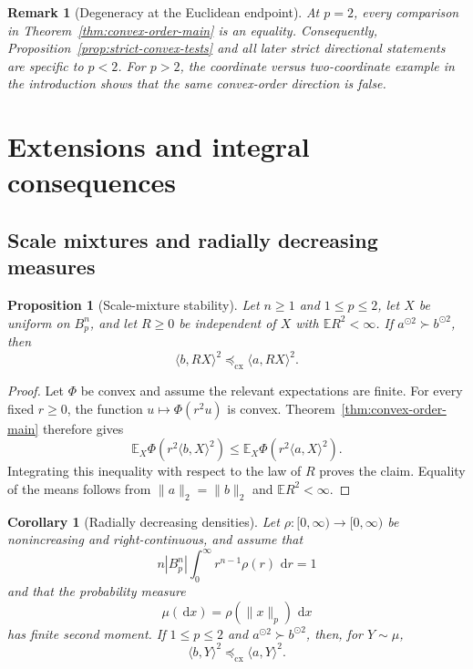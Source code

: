 \documentclass[pdflatex,sn-mathphys-num]{sn-jnl}
\numberwithin{equation}{section}
\theoremstyle{thmstyleone}
\newtheorem{proposition}[theorem]{Proposition}
\newtheorem{corollary}[theorem]{Corollary}
\theoremstyle{thmstylethree}
\newtheorem{remark}[theorem]{Remark}
\newcommand{\E}{\mathbb{E}}
\newcommand{\1}{\mathbf{1}}
\newcommand{\dd}{\,\mathrm{d}}
\newcommand{\cx}{\preceq_{\mathrm{cx}}}
\newcommand{\sqvec}[1]{#1^{\odot 2}}
\begin{document}
\begin{remark}[Degeneracy at the Euclidean endpoint]\label{rem:p-endpoints}
At $p=2$, every comparison in Theorem~\ref{thm:convex-order-main} is
an equality. Consequently, Proposition~\ref{prop:strict-convex-tests}
and all later strict directional statements are specific to $p<2$.
For $p>2$, the coordinate versus two-coordinate example in the
introduction shows that the same convex-order direction is false.
\end{remark}

\section{Extensions and integral consequences}\label{sec:extensions}

\subsection{Scale mixtures and radially decreasing measures}

\begin{proposition}[Scale-mixture stability]\label{prop:scale-mixture}
Let $n\ge1$ and $1\le p\le2$, let $X$ be uniform on $B_p^n$, and let
$R\ge0$ be
independent of $X$ with $\E R^2<\infty$. If $\sqvec a\succ\sqvec b$,
then
\[
 \langle b,RX\rangle^2\cx\langle a,RX\rangle^2.
\]
\end{proposition}

\begin{proof}
Let $\Phi$ be convex and assume the relevant expectations are finite.
For every fixed $r\ge0$, the function $u\mapsto\Phi(r^2u)$ is convex.
Theorem~\ref{thm:convex-order-main} therefore gives
\[
 \E_X\Phi\!\left(r^2\langle b,X\rangle^2\right)
 \le
 \E_X\Phi\!\left(r^2\langle a,X\rangle^2\right).
\]
Integrating this inequality with respect to the law of $R$ proves the
claim. Equality of the means follows from
$\|a\|_2=\|b\|_2$ and $\E R^2<\infty$.
\end{proof}

\begin{corollary}[Radially decreasing densities]\label{cor:radial-density}
Let $\rho:[0,\infty)\to[0,\infty)$ be nonincreasing and
right-continuous, and assume that
\[
 n|B_p^n|\int_0^\infty r^{n-1}\rho(r)\,\dd r=1
\]
and that the probability measure
\[
 \mu(\dd x)=\rho(\|x\|_p)\,\dd x
\]
has finite second moment. If $1\le p\le2$ and $\sqvec a\succ\sqvec b$,
then, for $Y\sim\mu$,
\[
 \langle b,Y\rangle^2\cx\langle a,Y\rangle^2.
\]
\end{corollary}
\end{document}
